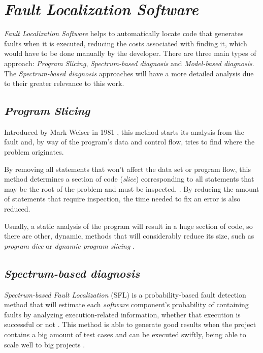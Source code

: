 \section{\emph{Fault Localization Software}}

\emph{Fault Localization Software} helps to automatically locate code that generates faults when it is executed, reducing the costs associated with finding it, which would have to be done manually by the developer.  There are three main types of approach: \emph{Program Slicing}, \emph{Spectrum-based diagnosis} and \emph{Model-based diagnosis}. The \emph{Spectrum-based diagnosis} approaches will have a more detailed analysis due to their greater relevance to this work.

% 
%

\subsection{\emph{Program Slicing}}

Introduced by Mark Weiser in 1981 \cite{Weiser1981, Weiser1982}, this method starts its analysis from the fault and, by way of the program's data and control flow, tries to find where the problem originates. 

By removing all statements that won't affect the data set or program flow, this method determines a section of code (\emph{slice}) corresponding to all statements that may be the root of the problem and must be inspected. \cite{Perez2004}. By reducing the amount of statements that require inspection, the time needed to fix an error is also reduced.

Usually, a static analysis of the program will result in a huge section of code, so there are other, dynamic, methods that will considerably reduce its size, such as \emph{program dice} or \emph{dynamic program slicing} \cite{Perez2004}.

% 
%

\subsection{\emph{Spectrum-based diagnosis}}

\emph{Spectrum-based Fault Localization} (SFL) is a probability-based fault detection method that will estimate each \emph{software} component's probability of containing faults by analyzing execution-related information, whether that execution is successful or not \cite{Abreu2007}. This method is able to generate good results when the project contains a big amount of test cases and can be executed swiftly, being able to scale well to big projects \cite{Mayer2008}.

